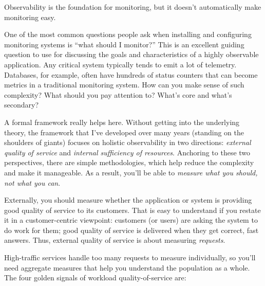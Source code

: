 \documentclass{vivid_layout}
\begin{document}
Observability is the foundation for monitoring, but it doesn't automatically make monitoring easy.

One of the most common questions people ask when installing and configuring
monitoring systems is ``what should I monitor?'' This is an excellent guiding
question to use for discussing the goals and characteristics of a highly observable application. Any critical system typically tends to emit a lot of telemetry. Databases, for example, often have hundreds of status counters that can become metrics in a traditional monitoring system. How can you make sense of such complexity? What should you pay attention to? What's core and what's secondary?

A formal framework really helps here. Without getting into the underlying theory, the framework that I've developed over many years (standing on the shoulders of giants) focuses on holistic observability in two directions: \emph{external quality of service} and \emph{internal sufficiency of resources}. Anchoring to these two perspectives, there are simple methodologies, which help reduce the complexity and make it manageable. As a result, you'll be able to \emph{measure what you should, not what you can}.

Externally, you should measure whether the application or system is providing good quality of service to its customers. That is easy to understand if you restate it in a customer-centric viewpoint: customers (or users) are asking the system to do work for them; good quality of service is delivered when they get correct, fast answers. Thus, external quality of service is about measuring \emph{requests}.

High-traffic services handle too many requests to measure individually, so you'll need aggregate measures that help you understand the population as a whole. The four golden signals of workload quality-of-service are:
\end{document}
